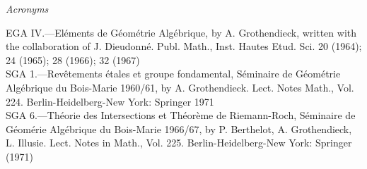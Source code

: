 \documentclass[10pt,reqno]{article}
\theoremstyle{plain}
\theoremstyle{definition}
\begin{document}
\noindent
\textit{Acronyms}

\noindent
EGA IV.---El{\'e}ments de G{\'e}om{\'e}trie Alg{\'e}brique,
by A. Grothendieck, written with the collaboration of J.
Dieudonn{\'e}. Publ. Math., Inst. Hautes Etud.
Sci. 20 (1964); 24 (1965); 28 (1966); 32 (1967)\\

\noindent
SGA 1.---Rev{\^e}tements {\'e}tales et groupe fondamental,
S{\'e}minaire de G{\'e}om{\'e}trie Alg{\'e}brique du
Bois-Marie 1960/61, by A. Grothendieck. Lect. Notes Math.,
Vol. 224. Berlin-Heidelberg-New York: Springer 1971\\

\noindent
SGA 6.---Th{\'e}orie des Intersections et Th{\'e}or{\`e}me de Riemann-Roch,
S{\'e}minaire de G{\'e}om{\'e}rie Alg{\'e}brique
du Bois-Marie 1966/67, by P. Berthelot, A. Grothendieck, L. Illusie.
Lect. Notes in Math., Vol. 225.
Berlin-Heidelberg-New York: Springer (1971) 
\end{document}
